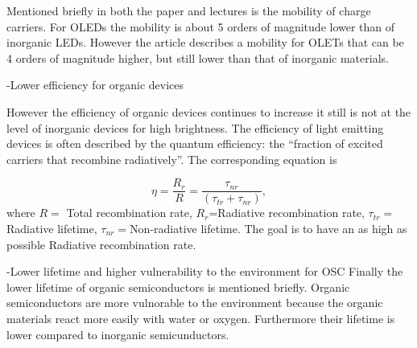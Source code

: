 Mentioned briefly in both the paper and lectures is the mobility of charge carriers. For OLEDs the mobility is about 5 orders of magnitude lower than of inorganic LEDs. However the article describes a mobility for OLETs that can be 4 orders of magnitude higher, but still lower than that of inorganic materials.

-Lower efficiency for organic devices

However the efficiency of organic devices continues to increase it still is not at the level of inorganic devices for high brightness. The efficiency of light emitting devices is often described by the quantum efficiency: the ``fraction of excited carriers that recombine radiatively''. The corresponding equation is

\[
 \eta = \frac{R_{r}}{R} = \frac{\tau_{nr}}{(\tau_{tr}+\tau_{nr})},
\]
where $R=$ Total recombination rate, $R_{r}$=Radiative recombination rate, $\tau_{tr}=$Radiative lifetime, $\tau_{nr}=$Non-radiative lifetime. The goal is to have an as high as possible Radiative recombination rate. 

-Lower lifetime and higher vulnerability to the environment for OSC
Finally the lower lifetime of organic semiconductors is mentioned briefly. Organic semiconductors are more vulnorable to the environment because the organic materials react more easily with water or oxygen. Furthermore their lifetime is lower compared to inorganic semicunductors. 
